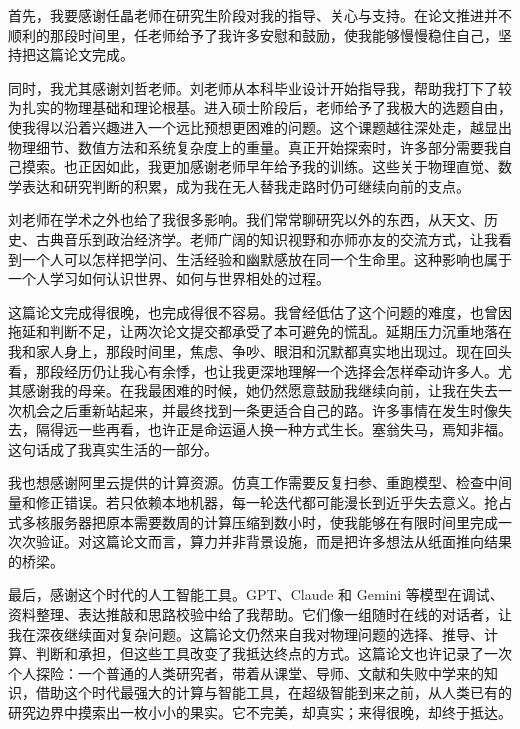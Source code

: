 \begin{acknowledgements}

首先，我要感谢任晶老师在研究生阶段对我的指导、关心与支持。在论文推进并不顺利的那段时间里，任老师给予了我许多安慰和鼓励，使我能够慢慢稳住自己，坚持把这篇论文完成。

同时，我尤其感谢刘哲老师。刘老师从本科毕业设计开始指导我，帮助我打下了较为扎实的物理基础和理论根基。进入硕士阶段后，老师给予了我极大的选题自由，使我得以沿着兴趣进入一个远比预想更困难的问题。这个课题越往深处走，越显出物理细节、数值方法和系统复杂度上的重量。真正开始探索时，许多部分需要我自己摸索。也正因如此，我更加感谢老师早年给予我的训练。这些关于物理直觉、数学表达和研究判断的积累，成为我在无人替我走路时仍可继续向前的支点。

刘老师在学术之外也给了我很多影响。我们常常聊研究以外的东西，从天文、历史、古典音乐到政治经济学。老师广阔的知识视野和亦师亦友的交流方式，让我看到一个人可以怎样把学问、生活经验和幽默感放在同一个生命里。这种影响也属于一个人学习如何认识世界、如何与世界相处的过程。

这篇论文完成得很晚，也完成得很不容易。我曾经低估了这个问题的难度，也曾因拖延和判断不足，让两次论文提交都承受了本可避免的慌乱。延期压力沉重地落在我和家人身上，那段时间里，焦虑、争吵、眼泪和沉默都真实地出现过。现在回头看，那段经历仍让我心有余悸，也让我更深地理解一个选择会怎样牵动许多人。尤其感谢我的母亲。在我最困难的时候，她仍然愿意鼓励我继续向前，让我在失去一次机会之后重新站起来，并最终找到一条更适合自己的路。许多事情在发生时像失去，隔得远一些再看，也许正是命运逼人换一种方式生长。塞翁失马，焉知非福。这句话成了我真实生活的一部分。

我也想感谢阿里云提供的计算资源。仿真工作需要反复扫参、重跑模型、检查中间量和修正错误。若只依赖本地机器，每一轮迭代都可能漫长到近乎失去意义。抢占式多核服务器把原本需要数周的计算压缩到数小时，使我能够在有限时间里完成一次次验证。对这篇论文而言，算力并非背景设施，而是把许多想法从纸面推向结果的桥梁。

最后，感谢这个时代的人工智能工具。GPT、Claude 和 Gemini 等模型在调试、资料整理、表达推敲和思路校验中给了我帮助。它们像一组随时在线的对话者，让我在深夜继续面对复杂问题。这篇论文仍然来自我对物理问题的选择、推导、计算、判断和承担，但这些工具改变了我抵达终点的方式。这篇论文也许记录了一次个人探险：一个普通的人类研究者，带着从课堂、导师、文献和失败中学来的知识，借助这个时代最强大的计算与智能工具，在超级智能到来之前，从人类已有的研究边界中摸索出一枚小小的果实。它不完美，却真实；来得很晚，却终于抵达。

\end{acknowledgements}
